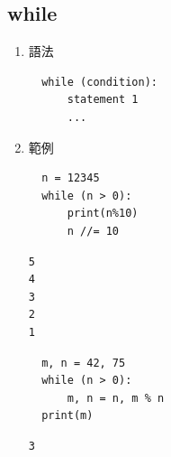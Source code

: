 \documentclass[a4paper,12pt]{article}
\begin{document}
\subsection{while}
\label{sec:orge92bc26}
\begin{enumerate}
\item 語法
\label{sec:org0326f3f}
\lstset{breaklines=true,language=Python,label= ,caption= ,captionpos=b,numbers=none}
\begin{lstlisting}
  while (condition):
      statement 1
      ...
\end{lstlisting}

\item 範例
\label{sec:orgc8dcbc8}
\lstset{breaklines=true,language=Python,label= ,caption= ,captionpos=b,firstnumber=1,numbers=left}
\begin{lstlisting}
  n = 12345
  while (n > 0):
      print(n%10)
      n //= 10
\end{lstlisting}

\begin{verbatim}
5 
4
3
2
1
\end{verbatim}


\lstset{breaklines=true,language=Python,label=最大公因數,caption= ,captionpos=b,firstnumber=1,numbers=left}
\begin{lstlisting}
  m, n = 42, 75
  while (n > 0):
      m, n = n, m % n
  print(m)
\end{lstlisting}

\begin{verbatim}
3
\end{verbatim}
\end{enumerate}
\end{document}
